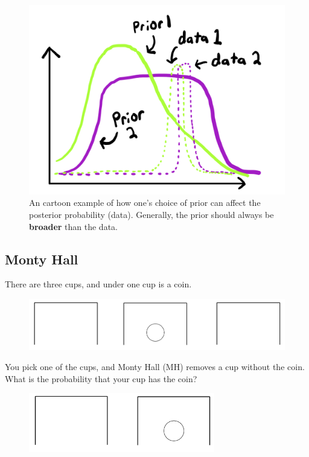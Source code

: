 \documentclass[12pt]{article}
\begin{document}
\begin{figure}[ht]
\includegraphics[scale=0.75]{prior_plot.png}
\centering
\caption{An cartoon example of how one's choice of prior can affect the posterior probability (data). Generally, the prior should always be \textbf{broader} than the data.} \label{fig:prior_plot}
\end{figure}

\subsection{Monty Hall}

\noindent There are three cups, and under one cup is a coin.

\begin{figure}[ht]
	\includegraphics[width=5.0in, keepaspectratio]{Three_Cups.png}
\end{figure}


\noindent You pick one of the cups, and Monty Hall (MH) removes a cup without the coin. What is the probability that your cup has the coin?

\begin{figure}[ht]
	\includegraphics[width=3.2in, keepaspectratio]{Two_Cups.png}
\end{figure}
\end{document}
